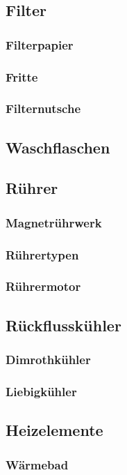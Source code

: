 \subsection{Filter}
\subsubsection{Filterpapier}
\subsubsection{Fritte}
\subsubsection{Filternutsche}

\subsection{Waschflaschen}

\subsection{Rührer}
\subsubsection{Magnetrührwerk}
\subsubsection{Rührertypen}
\subsubsection{Rührermotor}

\subsection{Rückflusskühler}
\subsubsection{Dimrothkühler}
\subsubsection{Liebigkühler}

\subsection{Heizelemente}
\subsubsection{Wärmebad}
